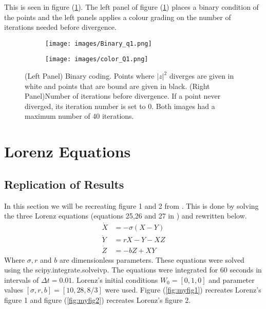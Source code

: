 \documentclass[12pt]{article}
\begin{document}
This is seen in figure (\ref{fig:mandelbrot}). The left panel of figure (\ref{fig:mandelbrot}) places a binary condition of the points and the left panels applies a colour grading on the number of iterations needed before divergence. 

\begin{figure}
    \centering
    \begin{subfigure}[h]{0.45\textwidth}
        \centering 
        \texttt{[image: images/Binary\_q1.png]}        
    \end{subfigure}
    \begin{subfigure}[h]{0.45\textwidth}
        \texttt{[image: images/color\_Q1.png]}
    \end{subfigure}
    \caption{(Left Panel) Binary coding. Points where $|z|^2$ diverges are given in white and points that are bound are given in black. (Right Panel)Number of iterations before divergence. If a point never diverged, its iteration number is set to 0. Both images had a maximum number of 40 iterations.}
    \label{fig:mandelbrot}
\end{figure}


\section{Lorenz Equations}

\subsection{Replication of Results}
In this section we will be recreating figure 1 and 2 from \cite{DeterministicNonperiodicFlow}. This is done by solving the three Lorenz equations (equations 25,26 and 27 in \cite{DeterministicNonperiodicFlow}) and rewritten below. 
\begin{align}\label{eqn:lorenz}
    \dot{X} &= -\sigma(X - Y) \\
    \dot{Y} &= rX - Y  - XZ \\
    \dot{Z} &= -bZ + XY    
\end{align} 
Where $\sigma, r$ and $b$ are dimensionless parameters. These equations were solved using the {\selectfont scipy.integrate.solve\textunderscore ivp}. The equations were integrated for 60 seconds in intervals of $\Delta t = 0.01$. Lorenz's initial conditions $W_0 = [0,1,0]$ and parameter values $[\sigma, r, b] = [10, 28, 8/3]$ were used. Figure (\ref{fig:myfig1}) recreates Lorenz's figure 1 and figure (\ref{fig:myfig2}) recreates Lorenz's figure 2.   
\end{document}
